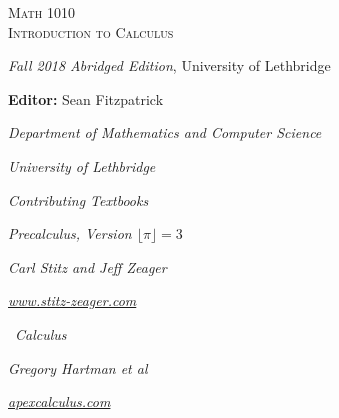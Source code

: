 
\hskip 125pt\begin{minipage}{\textwidth}
\begin{flushright}

\textsc{{\Huge Math 1010 \\
Introduction to Calculus}} \\

\bigskip

\textsl{\Large Fall 2018 Abridged Edition}, 
{\Large University of Lethbridge}\\


\bigskip

\Large
\vspace{1in}

\textbf{Editor:} Sean Fitzpatrick

\emph{\large Department of Mathematics and Computer Science}

\emph{\large University of Lethbridge}\vskip15pt

\parbox{200pt}{\textit{Contributing Textbooks}}\hskip 2cm \phantom{.}

\vspace{0.5in}

\textit{Precalculus, Version $\lfloor \pi\rfloor = 3$}

\emph{\large Carl Stitz and Jeff Zeager}

\emph{\large \href{http://www.stitz-zeager.com}{www.stitz-zeager.com}}\vskip 15pt

\apex\ \textit{Calculus}

\emph{\large Gregory Hartman et al}

\emph{\large \href{http://www.apexcalculus.com}{apexcalculus.com}}\vskip 15pt


\normalsize
\end{flushright}
\end{minipage}

